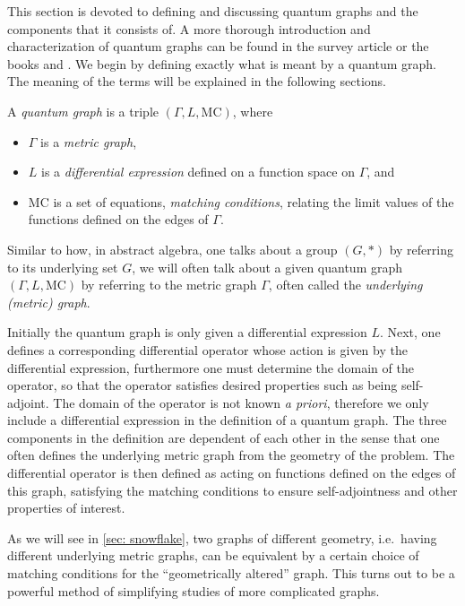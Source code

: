 This section is devoted to defining and discussing quantum graphs and the components that it consists of. A more thorough introduction and characterization of quantum graphs can be found in the survey article \cite{introduction and brief survey} or the books \cite{pavel book} and \cite{berkolaiko kuchment book}. We begin by defining exactly what is meant by a quantum graph. The meaning of the terms will be explained in the following sections.

\begin{definition}
  A \emph{quantum graph} is a triple $(\Gamma, L, \text{MC})$, where
  \begin{itemize}
    \item $\Gamma$ is a \emph{metric graph},
    \item $L$ is a \emph{differential expression} defined on a function space on $\Gamma$, and
    \item MC is a set of equations, \emph{matching conditions}, relating the limit values  of the functions defined on the edges of $\Gamma$.
  \end{itemize}
\end{definition}

Similar to how, in abstract algebra, one talks about a group $(G,*)$ by referring to its underlying set $G$, we will often talk about a given quantum graph $(\Gamma, L, \text{MC})$ by referring to the metric graph $\Gamma$, often called the \emph{underlying (metric) graph}.

Initially the quantum graph is only given a differential expression $L$. Next, one defines a corresponding differential operator whose action is given by the differential expression, furthermore one must determine the domain of the operator, so that the operator satisfies desired properties such as being self-adjoint. The domain of the operator is not known \textit{a priori}, therefore we only include a differential expression in the definition of a quantum graph.
The three components in the definition are dependent of each other in the sense that one often defines the underlying metric graph from the geometry of the problem. The differential operator is then defined as acting on functions defined on the edges of this graph, satisfying the matching conditions to ensure self-adjointness and other properties of interest.

As we will see in \cref{sec: snowflake}, two graphs of different geometry, i.e.\ having different underlying metric graphs, can be equivalent by a certain choice of matching conditions for the ``geometrically altered'' graph. This turns out to be a powerful method of simplifying studies of more complicated graphs.

